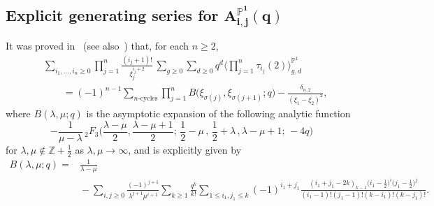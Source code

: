 \documentclass[pdftex]{sigma}
\newcommand{\bP}{\mathbb{P}}
\newcommand{\nn}{\nonumber}
\newcommand{\be}{\begin{equation}}
\newcommand{\ee}{\end{equation}}
\numberwithin{equation}{section}
\begin{document}
\subsection[Explicit generating series for A\string^{}\{P\string^1\}\_\{i,j\}(q)]{Explicit generating series for $\boldsymbol{A^{\bP^1}_{i,j}(q)}$}
It was proved in~\cite[Theorems 1--5 and equation~(93)]{DYZ} (see also~\cite{DY2, Marchal, Y}) that, for each $n\ge2$,
\begin{align*}
& \sum_{i_1,\dots,i_n\geq0} \prod_{j=1}^n \frac{(i_j+ 1)!}{\xi^{i_j+2}_j} \,
\sum_{g\geq 0}\sum_{d\geq 0} q^d
\Biggl\langle \prod_{j=1}^n \tau_{i_j} (2) \Biggr\rangle^{\bP^1}_{g,d} \\
&\qquad{}= (-1)^{n-1}
\sum_{\text{$n$-cycles}}
\prod_{j=1}^n B\bigl(\xi_{\sigma(j)}, \xi_{\sigma(j+1)};q\bigr) - \frac{\delta_{n,2}}{(\xi_1-\xi_2)^2}, \nn
\end{align*}
where $B(\lambda,\mu;q)$ is the asymptotic expansion of the following analytic function
\be\label{anaB}
-\frac1{\mu-\lambda}\, {}_2 F_3\biggl(\frac{\lambda-\mu}2, \frac{\lambda-\mu+1}2; \, \frac12 - \mu \,, \, \frac12 + \lambda \,, \lambda-\mu+1; \, -4 q\biggr)
\ee
for $\lambda,\mu\notin\mathbb{Z}+\frac12$ as $\lambda,\mu\to\infty$,
and is explicitly given by
\begin{align}
B(\lambda, \mu;q) ={}& \frac{1}{\lambda - \mu} \label{Dlargeabexpansion} \\
&{}{-}
\sum_{i,j\geq 0} \frac{(-1)^{j+1}}{\lambda^{j+1} \mu^{i+1} }
\sum_{k\geq 1} \frac{q^{k}}{k!}\sum_{1\leq i_1,j_1 \leq k}\!
(-1)^{i_1+j_1} \frac{(i_1 + j_1 - 2k)_{k-1} \bigl(i_1 -\frac{1}{2}\bigr)^{i}
\bigl(j_1 - \frac{1}{2}\bigr)^{j}}{(i_1-1)!(j_1-1)!(k-i_1)!(k-j_1)!}.\nn
\end{align}
\end{document}
